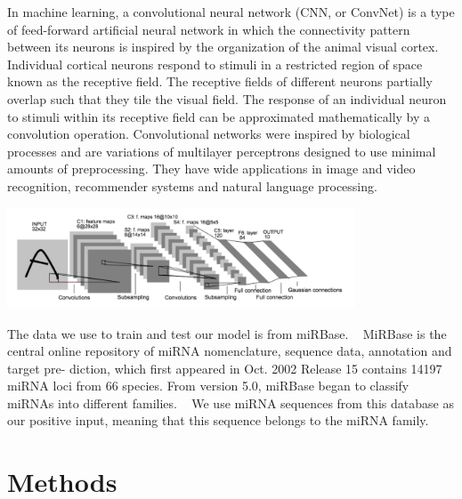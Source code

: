 \documentclass[letterpaper, 11pt]{article}
\newenvironment{Figure}
  {\par\medskip\noindent\minipage{\linewidth}}
  {\endminipage\par\medskip}
\begin{document}
\begin{multicols*}{2}
{In machine learning, a convolutional neural network (CNN, or ConvNet) is a type of feed-forward artificial neural network in which the connectivity pattern between its neurons is inspired by the organization of the animal visual cortex. Individual cortical neurons respond to stimuli in a restricted region of space known as the receptive field. The receptive fields of different neurons partially overlap such that they tile the visual field. The response of an individual neuron to stimuli within its receptive field can be approximated mathematically by a convolution operation. Convolutional networks were inspired by biological processes and are variations of multilayer perceptrons designed to use minimal amounts of preprocessing. They have wide applications in image and video recognition, recommender systems and natural language processing.
~\cite{Convolutional-deep-belief}
~\cite{CNN}
\begin{Figure}
\includegraphics[height = 3cm, width = \textwidth]{lenet.png}
\end{Figure}

The data we use to train and test our model is from miRBase.
~\cite{mirBase} 
MiRBase is the central online repository of miRNA nomenclature, sequence data, annotation and target pre- diction, which first appeared in Oct. 2002 Release 15 contains 14197 miRNA loci from 66 species. From version 5.0, miRBase began to classify miRNAs into different families.
~\cite{miRFam}
We use miRNA sequences from this database as our positive input, meaning that this sequence belongs to the miRNA family. 
}
\section{Methods}
{
}
\end{multicols*}
\end{document}
